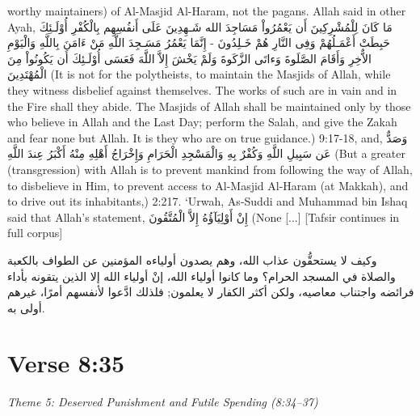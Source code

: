 \documentclass[11pt,a4paper,openany]{book}
\let\textAR\textarabic
\begin{document}
\begin{tafsirbox}
worthy maintainers) of Al-Masjid Al-Haram, not the pagans. Allah said in other Ayah, \textAR{مَا} \textAR{كَانَ} \textAR{لِلْمُشْرِكِينَ} \textAR{أَن} \textAR{يَعْمُرُواْ} \textAR{مَسَاجِدَ} \textAR{الله} \textAR{شَـهِدِينَ} \textAR{عَلَى} \textAR{أَنفُسِهِم} \textAR{بِالْكُفْرِ} \textAR{أُوْلَـئِكَ} \textAR{حَبِطَتْ} \textAR{أَعْمَـلُهُمْ} \textAR{وَفِى} \textAR{النَّارِ} \textAR{هُمْ} \textAR{خَـلِدُونَ} - \textAR{إِنَّمَا} \textAR{يَعْمُرُ} \textAR{مَسَـجِدَ} \textAR{اللَّهِ} \textAR{مَنْ} \textAR{ءَامَنَ} \textAR{بِاللَّهِ} \textAR{وَالْيَوْمِ} \textAR{الاٌّخِرِ} \textAR{وَأَقَامَ} \textAR{الصَّلَوةَ} \textAR{وَءاتَى} \textAR{الزَّكَوةَ} \textAR{وَلَمْ} \textAR{يَخْشَ} \textAR{إِلاَّ} \textAR{اللَّهَ} \textAR{فَعَسَى} \textAR{أُوْلَـئِكَ} \textAR{أَن} \textAR{يَكُونُواْ} \textAR{مِنَ} \textAR{الْمُهْتَدِينَ} (It is not for the polytheists, to maintain the Masjids of Allah, while they witness disbelief against themselves. The works of such are in vain and in the Fire shall they abide. The Masjids of Allah shall be maintained only by those who believe in Allah and the Last Day; perform the Salah, and give the Zakah and fear none but Allah. It is they who are on true guidance.) 9:17-18, and, \textAR{وَصَدٌّ} \textAR{عَن} \textAR{سَبِيلِ} \textAR{اللَّهِ} \textAR{وَكُفْرٌ} \textAR{بِهِ} \textAR{وَالْمَسْجِدِ} \textAR{الْحَرَامِ} \textAR{وَإِخْرَاجُ} \textAR{أَهْلِهِ} \textAR{مِنْهُ} \textAR{أَكْبَرُ} \textAR{عِندَ} \textAR{اللَّهِ} (But a greater (transgression) with Allah is to prevent mankind from following the way of Allah, to disbelieve in Him, to prevent access to Al-Masjid Al-Haram (at Makkah), and to drive out its inhabitants,) 2:217. `Urwah, As-Suddi and Muhammad bin Ishaq said that Allah's statement, \textAR{إِنْ} \textAR{أَوْلِيَآؤُهُ} \textAR{إِلاَّ} \textAR{الْمُتَّقُونَ} (None  [...] [Tafsir continues in full corpus]
\end{tafsirbox}


\begin{muyassarbox}
\textAR{وكيف لا يستحقُّون عذاب الله، وهم يصدون أولياءه المؤمنين عن الطواف بالكعبة والصلاة في المسجد الحرام؟ وما كانوا أولياء الله، إنْ أولياء الله إلا الذين يتقونه بأداء فرائضه واجتناب معاصيه، ولكن أكثر الكفار لا يعلمون; فلذلك ادَّعوا لأنفسهم أمرًا، غيرهم أولى به.}
\end{muyassarbox}


\newpage

\section{Verse 8:35}
{\small\color{accent2}\itshape Theme 5: Deserved Punishment and Futile Spending (8:34--37)}
\end{document}
